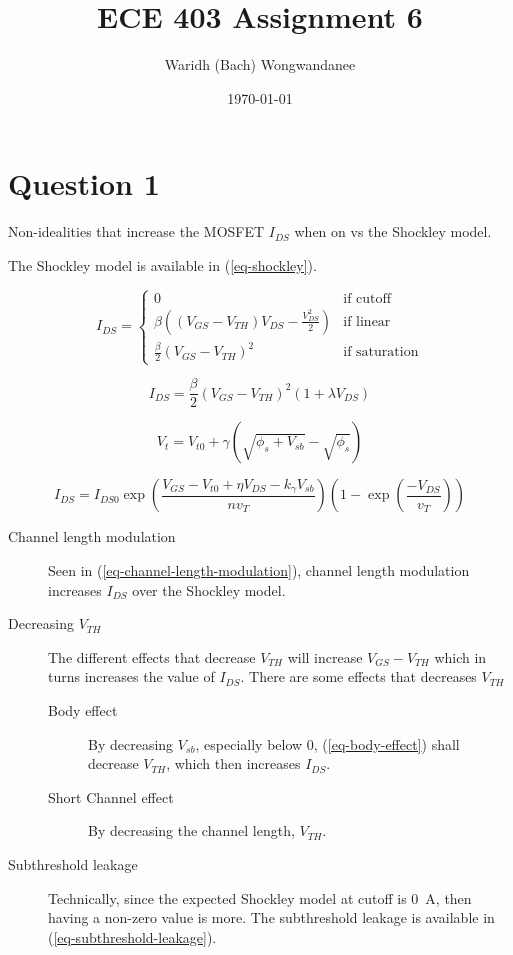 \documentclass[hidelinks, 11pt]{article}
\author{Waridh (Bach) Wongwandanee}
\date{\today}
\title{ECE 403 Assignment 6}
\begin{document}
\section*{Question 1}
\label{sec:org2bca8aa}
Non-idealities that increase the MOSFET \(I_{DS}\) when on vs the Shockley model.

The Shockley model is available in (\ref{eq-shockley}).

\begin{equation}
\label{eq-shockley}
  I_{DS} = \begin{cases}
    0 & \text{if cutoff} \\
    \beta\left( \left( V_{GS} - V_{TH} \right) V_{DS} - \frac{V_{DS}^2}{2} \right) & \text{if linear} \\
    \frac{\beta}{2} \left( V_{GS} - V_{TH} \right)^2 & \text{if saturation}
  \end{cases}
\end{equation}

\begin{equation}
\label{eq-channel-length-modulation}
I_{DS} = \frac{\beta}{2} \left( V_{GS} - V_{TH} \right)^2 \left( 1 + \lambda V_{DS} \right)
\end{equation}

\begin{equation}
\label{eq-body-effect}
V_t = V_{t0} + \gamma \left( \sqrt{\phi_s + V_{sb}} - \sqrt{\phi_s} \right)
\end{equation}

\begin{equation}
\label{eq-subthreshold-leakage}
I_{DS} = I_{DS0} \exp \left( \frac{V_{GS} - V_{t0} + \eta V_{DS} - k_\gamma V_{sb}}{n v_T} \right) \left( 1 - \exp \left( \frac{-V_{DS}}{v_T} \right) \right)
\end{equation}

\begin{description}
\item[{Channel length modulation}] Seen in (\ref{eq-channel-length-modulation}), channel length modulation increases \(I_{DS}\) over the Shockley model.
\item[{Decreasing \(V_{TH}\)}] The different effects that decrease \(V_{TH}\) will increase \(V_{GS} - V_{TH}\) which in turns increases the value of \(I_{DS}\).
There are some effects that decreases \(V_{TH}\)
\begin{description}
\item[{Body effect}] By decreasing \(V_{sb}\), especially below 0, (\ref{eq-body-effect}) shall decrease \(V_{TH}\), which then increases \(I_{DS}\).
\item[{Short Channel effect}] By decreasing the channel length, \(V_{TH}\).
\end{description}
\item[{Subthreshold leakage}] Technically, since the expected Shockley model at cutoff is \qty{0}{A}, then having a non-zero value is more. The subthreshold leakage is available in (\ref{eq-subthreshold-leakage}).
\end{description}
\end{document}
